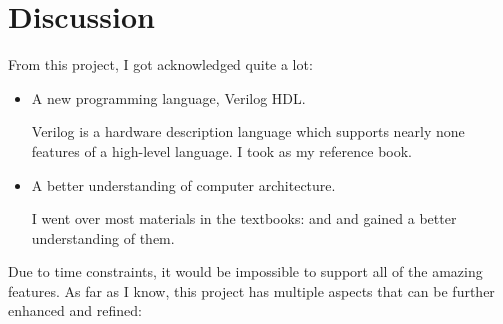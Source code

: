 \documentclass{article}
\begin{document}
%
%

\newpage
\section{Discussion}
From this project, I got acknowledged quite a lot:
\begin{itemize}
\item
A new programming language, Verilog HDL.

Verilog is a hardware description language which supports nearly none features of a high-level language. I took \cite{palnitkar2003verilog} as my reference book.
\item
A better understanding of computer architecture.

I went over most materials in the textbooks: \cite{hennessy2011computer} and \cite{patterson2013computer} and gained a better understanding of them.
\end{itemize}
Due to time constraints, it would be impossible to support all of the amazing features. As far as I know, this project has multiple aspects that can be further enhanced and refined:
\end{document}
